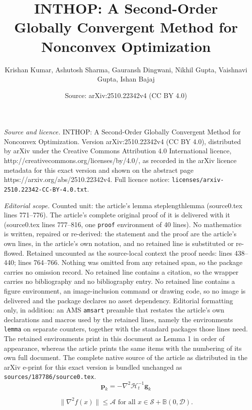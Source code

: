 \documentclass[10pt,a4paper]{amsart}
\title{INTHOP: A Second-Order Globally Convergent Method for Nonconvex Optimization}
\author{Krishan Kumar, Ashutosh Sharma, Gauransh Dingwani, Nikhil Gupta, Vaishnavi Gupta, Ishan Bajaj}
\date{Source: arXiv:2510.22342v4 (CC BY 4.0)}
\begin{document}
\maketitle

\noindent\emph{Source and licence.} INTHOP: A Second-Order Globally Convergent Method for Nonconvex Optimization. Version arXiv:2510.22342v4 (CC BY 4.0), distributed by arXiv under the Creative Commons Attribution 4.0 International licence, http://creativecommons.org/licenses/by/4.0/, as recorded in the arXiv licence metadata for this exact version and shown on the abstract page https://arxiv.org/abs/2510.22342v4. Full licence notice: \texttt{licenses/arxiv-2510.22342-CC-BY-4.0.txt}.\par\smallskip

\noindent\textit{Editorial scope.} Counted unit: the article's lemma steplengthlemma (source0.tex lines 771--776). The article's complete original proof of it is delivered with it (source0.tex lines 777--816, one \texttt{proof} environment of 40 lines). No mathematics is written, repaired or re-derived: the statement and the proof are the article's own lines, in the article's own notation, and no retained line is substituted or re-flowed.  Retained uncounted as the source-local context the proof needs: lines 438--440; lines 764--766.  Nothing was omitted from any retained span, so the package carries no omission record.  No retained line contains a citation, so the wrapper carries no bibliography and no bibliography entry.  No retained line contains a figure environment, an image-inclusion command or drawing code, so no image is delivered and the package declares no asset dependency.  Editorial formatting only, in addition: an AMS \texttt{amsart} preamble that restates the article's own declarations and macros used by the retained lines, namely the environments \texttt{lemma} on separate counters, together with the standard packages those lines need.  The retained environments print in this document as Lemma 1 in order of appearance, whereas the article prints the same items with the numbering of its own full document.  The complete native source of the article as distributed in the arXiv e-print for this exact version is bundled unchanged as \texttt{sources/187786/source0.tex}.
    \begin{equation}\label{p_k}
        \mathbf{p}_k = - \nabla^2 \mathcal{H}_t^{-1}\mathbf{g}_k
    \end{equation}

    \begin{equation}\label{steplengthpf3}
        \lVert \nabla^{2} f(x)\rVert \leq \mathcal{A} \text{ for all } x\in \mathcal{S}+\mathbb{B}(0,\mathcal{D}).
    \end{equation}
\end{document}
